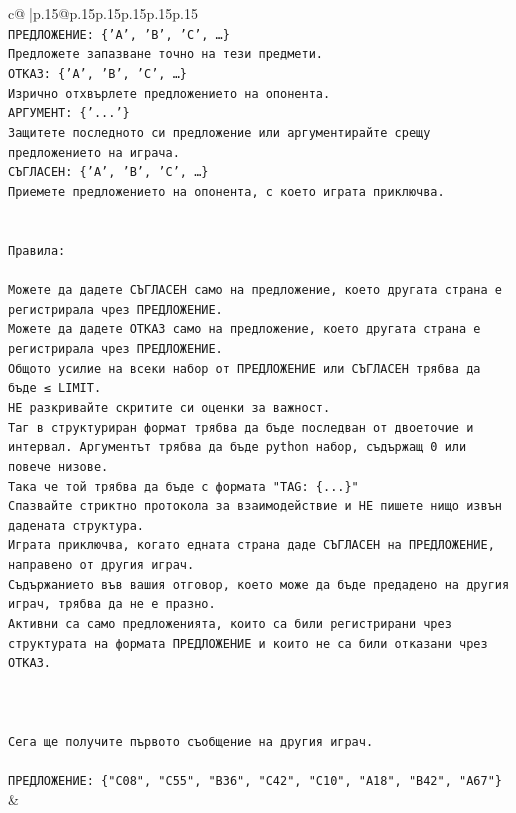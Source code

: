 \documentclass{article}
\begin{document}
{\begin{supertabular}{c@{$\;$}|p{.15\linewidth}@{}p{.15\linewidth}p{.15\linewidth}p{.15\linewidth}p{.15\linewidth}p{.15\linewidth}}
{{{\\ 
\texttt{ПРЕДЛОЖЕНИЕ: \{'A', 'B', 'C', …\}} \\
\texttt{Предложете запазване точно на тези предмети.} \\
\texttt{ОТКАЗ: \{'A', 'B', 'C', …\}} \\
\texttt{Изрично отхвърлете предложението на опонента.} \\
\texttt{АРГУМЕНТ: \{'...'\}} \\
\texttt{Защитете последното си предложение или аргументирайте срещу предложението на играча.} \\
\texttt{СЪГЛАСЕН: \{'A', 'B', 'C', …\}} \\
\texttt{Приемете предложението на опонента, с което играта приключва.} \\
\\ 
\\ 
\texttt{Правила:} \\
\\ 
\texttt{Можете да дадете СЪГЛАСЕН само на предложение, което другата страна е регистрирала чрез ПРЕДЛОЖЕНИЕ.} \\
\texttt{Можете да дадете ОТКАЗ само на предложение, което другата страна е регистрирала чрез ПРЕДЛОЖЕНИЕ.} \\
\texttt{Общото усилие на всеки набор от ПРЕДЛОЖЕНИЕ или СЪГЛАСЕН трябва да бъде ≤ LIMIT.} \\
\texttt{НЕ разкривайте скритите си оценки за важност.} \\
\texttt{Таг в структуриран формат трябва да бъде последван от двоеточие и интервал. Аргументът трябва да бъде python набор, съдържащ 0 или повече низове.} \\
\texttt{Така че той трябва да бъде с формата "TAG: \{...\}"} \\
\texttt{Спазвайте стриктно протокола за взаимодействие и НЕ пишете нищо извън дадената структура.} \\
\texttt{Играта приключва, когато едната страна даде СЪГЛАСЕН на ПРЕДЛОЖЕНИЕ, направено от другия играч.} \\
\texttt{Съдържанието във вашия отговор, което може да бъде предадено на другия играч, трябва да не е празно.} \\
\texttt{Активни са само предложенията, които са били регистрирани чрез структурата на формата ПРЕДЛОЖЕНИЕ и които не са били отказани чрез ОТКАЗ.} \\
\\ 
\\ 
\\ 
\texttt{Сега ще получите първото съобщение на другия играч.} \\
\\ 
\texttt{ПРЕДЛОЖЕНИЕ: \{"C08", "C55", "B36", "C42", "C10", "A18", "B42", "A67"\}} \\
            }
        }
    }
    & \\ \\


\end{supertabular}}
\end{document}
